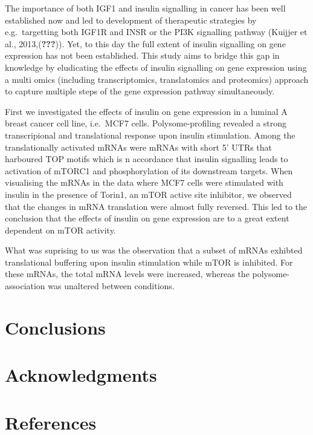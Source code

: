 \documentclass[12pt,openany]{book}
\begin{document}
The importance of both IGF1 and insulin signalling in cancer has been
well established now and led to development of therapeutic strategies by
e.g.~targetting both IGF1R and INSR or the PI3K signalling pathway
(Kuijjer et al., 2013,({\textbf{???}})). Yet, to this day the full
extent of insulin signalling on gene expression has not been
established. This study aims to bridge this gap in knowledge by
eludicating the effects of insulin signalling on gene expression using a
multi omics (including transcriptomics, translatomics and proteomics)
approach to capture multiple steps of the gene expression pathway
simultaneously.

First we investigated the effects of insulin on gene expression in a
luminal A breast cancer cell line, i.e.~MCF7 cells. Polysome-profiling
revealed a strong transcripional and translational response upon insulin
stimulation. Among the translationally activated mRNAs were mRNAs with
short 5' UTRs that harboured TOP motifs which is n accordance that
insulin signalling leads to activation of mTORC1 and phosphorylation of
its downstream targets. When visualising the mRNAs in the data where
MCF7 cells were stimulated with insulin in the presence of Torin1, an
mTOR active site inhibitor, we observed that the changes in mRNA
translation were almost fully reversed. This led to the conclusion that
the effects of insulin on gene expression are to a great extent
dependent on mTOR activity.

What was suprising to us was the observation that a subset of mRNAs
exhibted translational buffering upon insulin stimulation while mTOR is
inhibited. For these mRNAs, the total mRNA levels were increased,
whereas the polysome-association was unaltered between conditions.

\chapter{Conclusions}

\chapter*{Acknowledgments}\label{acknowledgments}

\chapter*{References}\label{references}
\end{document}
